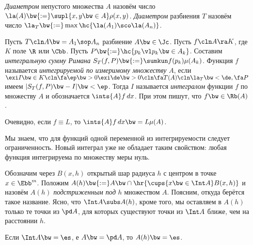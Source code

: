 \documentclass[a4paper]{article}
\begin{document}
\begin{df}
\emph{Диаметром} непустого множества $A$ назовём число $\la(A) \bw{:=}\supl{x,y \bw\in A} \rho(x,y)$.
\emph{Диаметром} разбиения $T$ назовём число $\la_T \bw{:=}\max \hc{\la(A_1)\sco \la(A_n)}$.
\end{df}

\begin{df}
Пусть $T\cln A\bw=A_1\sop A_n$ разбиение $A\bw\in \Jc$. Пусть $f \cln A \ra K$, где $K$ поле $\R$ или
$\Cbb$. Пусть $P \bw{:=}\hc{p_k \vl p_k \bw\in A_k}$. Составим \emph{интегральную сумму Римана} $S_T(f, P)
\bw{:=}\sumkun f(p_k)\mu(A_k)$. Функция $f$ называется \emph{интегрируемой по измеримому множеству} $A$, если
$\exi I \bw\in K\cln \fa \ep \bw> 0 \exi \de\bw>0\cln \fa T(A)\cln \la_T \bw< \de, \fa P$ имеем $|S_T(f,P)
\bw- I| \bw< \ep$. Тогда $I$ называется \emph{интегралом} функции $f$ по множеству $A$ и обозначается
$\ints{A}f \,d x$. При этом пишут, что $f \bw\in \Rb(A)$.
\end{df}

Очевидно, если $f \equiv L$, то $\ints{A}f \,dx \bw= L \mu(A)$.

\begin{note}
Мы знаем, что для функций одной переменной из интегрируемости следует ограниченность. Новый
интеграл уже не обладает таким свойством: любая функция интегрируема по множеству меры нуль.
\end{note}

\begin{df}
Обозначим через $B(x,h)$ открытый шар радиуса $h$ с центром в точке $x \in \Ebb^m$.
Положим $A(h)\bw{:=} A \bw\cap \hr{\cups{x\bw\in\Int A} B(x,h)}$ и назовём $A(h)$ \emph{подстриженным
под} $h$ множеством $A$. Поясним, откуда берётся такое название. Ясно, что $\Int A \subs A(h)$,
кроме того, мы оставляем в $A(h)$ только те точки из $\pd A$, для которых существуют точки из $\Int
A$ ближе, чем на расстоянии $h$.
\end{df}

\begin{note}
Если $\Int A \bw= \es$, е $A \bw= \pd A$, то $A(h) \bw= \es$.
\end{note}
\end{document}
